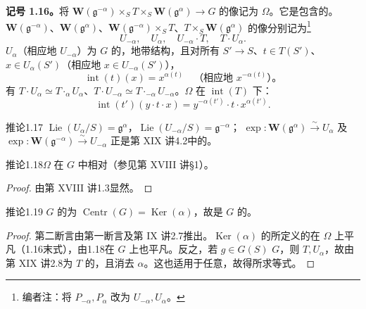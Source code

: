 \textbf{记号 1.16。}将 $\mathbf W(\mathfrak g^{-\alpha})\times_S T\times_S\mathbf W(\mathfrak g^\alpha)\to G$ 的像记为 $\Omega$。它是包含的。$\mathbf W(\mathfrak g^{-\alpha})$、$\mathbf W(\mathfrak g^\alpha)$、$\mathbf W(\mathfrak g^{-\alpha})\times_ST$、$T\times_S\mathbf W(\mathfrak g^\alpha)$ 的像分别记为\footnote{编者注：将 $P_{-\alpha},P_\alpha$ 改为 $U_{-\alpha},U_\alpha$。}
\[U_{-\alpha},\quad U_\alpha,\quad U_{-\alpha}\cdot T,\quad T\cdot U_\alpha.\]
$U_\alpha$（相应地 $U_{-\alpha}$）为 $G$ 的，地带结构，且对所有 $S'\to S$、$t\in T(S')$、$x\in U_\alpha(S')$（相应地 $x\in U_{-\alpha}(S')$），
\[\operatorname{int}(t)(x)=x^{\alpha(t)}\quad\text{（相应地 }x^{-\alpha(t)}\text{）。}\]
有 $T\cdot U_\alpha\simeq T\mathbin{\cdot}_\alpha U_\alpha$、$T\cdot U_{-\alpha}\simeq T\mathbin{\cdot}_{-\alpha}U_{-\alpha}$。$\Omega$ 在 $\operatorname{int}(T)$ 下：
\[\operatorname{int}(t')(y\cdot t\cdot x)=y^{-\alpha(t')}\cdot t\cdot x^{\alpha(t')}.\]
\begin{SGAresult}{推论}{1.17}
$\operatorname{Lie}(U_\alpha/S)=\mathfrak g^\alpha$，$\operatorname{Lie}(U_{-\alpha}/S)=\mathfrak g^{-\alpha}$； $\exp:\mathbf W(\mathfrak g^\alpha)\xrightarrow\sim U_\alpha$ 及 $\exp:\mathbf W(\mathfrak g^{-\alpha})\xrightarrow\sim U_{-\alpha}$ 正是第 XIX 讲4.2中的。
\end{SGAresult}
\begin{SGAresult}{推论}{1.18}$\Omega$ 在 $G$ 中相对（参见第 XVIII 讲§1）。\end{SGAresult}
\begin{proof}由第 XVIII 讲1.3显然。\end{proof}
\begin{SGAresult}{推论}{1.19}
$G$ 的为 $\operatorname{Centr}(G)=\operatorname{Ker}(\alpha)$，故是 $G$ 的。
\end{SGAresult}
\begin{proof}
第二断言由第一断言及第 IX 讲2.7推出。$\operatorname{Ker}(\alpha)$ 的所定义的在 $\Omega$ 上平凡（1.16末式），由1.18在 $G$ 上也平凡。反之，若 $g\in G(S)$  $G$，则 $T,U_\alpha$，故由第 XIX 讲2.8为 $T$ 的，且消去 $\alpha$。这也适用于任意，故得所求等式。
\end{proof}
